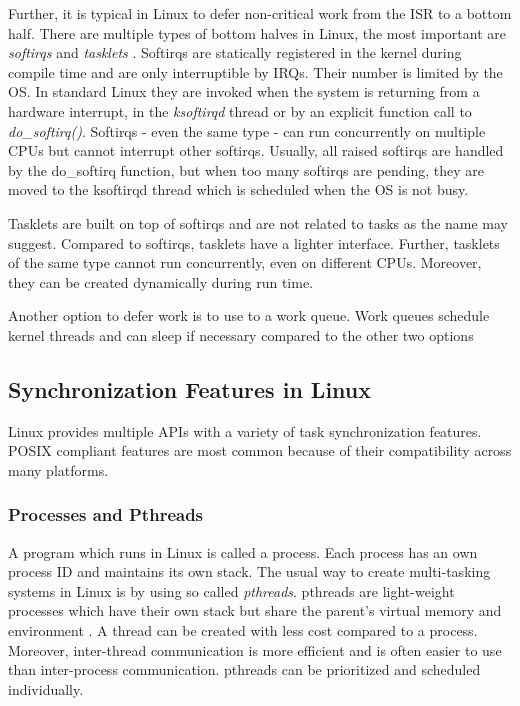 Further, it is typical in Linux to defer non-critical work from the \ac{ISR} to a bottom half.
There are multiple types of bottom halves in Linux, the most important are \textit{softirqs} and \textit{tasklets} \cite{love:lkd}.
Softirqs are statically registered in the kernel during compile time and are only interruptible by \acp{IRQ}.
Their number is limited by the \ac{OS}.
In standard Linux they are invoked when the system is returning from a hardware interrupt, in the \textit{ksoftirqd} thread or by an explicit function call to \textit{do\_softirq()}.
Softirqs - even the same type - can run concurrently on multiple \acp{CPU} but cannot interrupt other softirqs.
Usually, all raised softirqs are handled by the do\_softirq function, but when too many softirqs are pending, they are moved to the ksoftirqd thread which is scheduled when the \ac{OS} is not busy.
\par
Tasklets are built on top of softirqs and are not related to tasks as the name may suggest. 
Compared to softirqs, tasklets have a lighter interface.
Further, tasklets of the same type cannot run concurrently, even on different \acp{CPU}.
Moreover, they can be created dynamically during run time.
\par
Another option to defer work is to use to a work queue.
Work queues schedule kernel threads and can sleep if necessary compared to the other two options

\subsection{Synchronization Features in Linux}\label{ss_sync_features_in_linux}
Linux provides multiple \acp{API} with a variety of task synchronization features. 
\ac{POSIX} compliant features are most common because of their compatibility across many platforms.
\subsubsection{Processes and Pthreads}\label{sss_processes_and_pthreads}
A program which runs in Linux is called a process. 
Each process has an own process ID and maintains its own stack. 
The usual way to create multi-tasking systems in Linux is by using so called \textit{pthreads}.
pthreads are light-weight processes which have their own stack but share the parent's virtual memory and environment \cite{barney:pthreads}.
A thread can be created with less cost compared to a process.
Moreover, inter-thread communication is more efficient and is often easier to use than inter-process communication.
pthreads can be prioritized and scheduled individually. 

